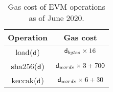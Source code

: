 \begin{table}[!h]
\centering
\begin{tabular}{|c|c|}
\hline
\textbf{Operation} & \textbf{Gas cost} \\ \hline
\textsf{load}($\mathsf{d}$)            & $ \mathsf{d}_{bytes} \times 16 $          \\ \hline
\textsf{sha256}($\mathsf{d}$)          & $\mathsf{d}_{words} \times 3 + 700 $     \\ \hline
\textsf{keccak}($\mathsf{d}$)          & $\mathsf{d}_{words} \times 6 + 30 $      \\ \hline
\end{tabular}
\caption{Gas cost of EVM operations as of June 2020.}
\label{tab:operations-gas}
\vspace*{-5mm}
\end{table}
